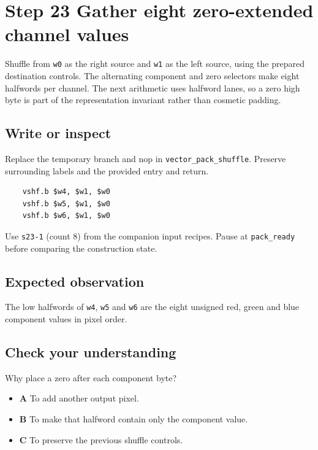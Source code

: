 \section{Step 23 Gather eight zero-extended channel values}\label{rgb-s23}

Shuffle from \texttt{w0} as the right source and \texttt{w1} as the left source, using the prepared destination controls. The alternating component and zero selectors make eight halfwords per channel. The next arithmetic uses halfword lanes, so a zero high byte is part of the representation invariant rather than cosmetic padding.

\subsection{Write or inspect}
Replace the temporary branch and nop in \texttt{vector\_pack\_shuffle}. Preserve surrounding labels and the provided entry and return.

\begin{verbatim}
    vshf.b $w4, $w1, $w0
    vshf.b $w5, $w1, $w0
    vshf.b $w6, $w1, $w0
\end{verbatim}
Use \texttt{s23-1} (count 8) from the companion input recipes. Pause at \texttt{pack\_ready} before comparing the construction state.

\subsection{Expected observation}
The low halfwords of \texttt{w4}, \texttt{w5} and \texttt{w6} are the eight unsigned red, green and blue component values in pixel order.

\subsection{Check your understanding}
Why place a zero after each component byte?

\begin{itemize}
  \item \textbf{A} To add another output pixel.
  \item \textbf{B} To make that halfword contain only the component value.
  \item \textbf{C} To preserve the previous shuffle controls.
\end{itemize}

